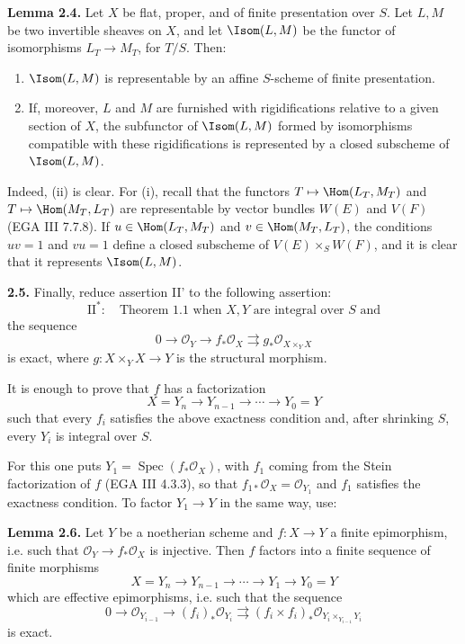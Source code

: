 \documentclass[11pt]{article}
\newcommand{\Spec}{\operatorname{Spec}}
\begin{document}
\textbf{Lemma 2.4.} Let \(X\) be flat, proper, and of finite presentation over \(S\). Let \(L,M\) be two invertible sheaves on \(X\), and let \(\Isom(L,M)\) be the functor of isomorphisms \(L_T\to M_T\), for \(T/S\). Then:
\begin{enumerate}[label=\roman*)]
\item \(\Isom(L,M)\) is representable by an affine \(S\)-scheme of finite presentation.
\item If, moreover, \(L\) and \(M\) are furnished with rigidifications relative to a given section of \(X\), the subfunctor of \(\Isom(L,M)\) formed by isomorphisms compatible with these rigidifications is represented by a closed subscheme of \(\Isom(L,M)\).
\end{enumerate}
Indeed, (ii) is clear. For (i), recall that the functors \(T\mapsto\Hom(L_T,M_T)\) and \(T\mapsto\Hom(M_T,L_T)\) are representable by vector bundles \(W(E)\) and \(V(F)\) (EGA III 7.7.8). If \(u\in\Hom(L_T,M_T)\) and \(v\in\Hom(M_T,L_T)\), the conditions \(uv=1\) and \(vu=1\) define a closed subscheme of \(V(E)\times_SW(F)\), and it is clear that it represents \(\Isom(L,M)\).

\textbf{2.5.} Finally, reduce assertion II' to the following assertion:
\[
  \text{II}^*:\quad
  \text{Theorem 1.1 when }X,Y\text{ are integral over }S\text{ and}
\]
the sequence
\[
  0\longrightarrow \mathcal O_Y
  \longrightarrow f_*\mathcal O_X
  \rightrightarrows g_*\mathcal O_{X\times_Y X}
\]
is exact, where \(g:X\times_YX\to Y\) is the structural morphism.

It is enough to prove that \(f\) has a factorization
\[
  X=Y_n\longrightarrow Y_{n-1}\longrightarrow\cdots\longrightarrow Y_0=Y
\]
such that every \(f_i\) satisfies the above exactness condition and, after shrinking \(S\), every \(Y_i\) is integral over \(S\).

For this one puts \(Y_1=\Spec(f_*\mathcal O_X)\), with \(f_1\) coming from the Stein factorization of \(f\) (EGA III 4.3.3), so that \(f_{1*}\mathcal O_X=\mathcal O_{Y_1}\) and \(f_1\) satisfies the exactness condition. To factor \(Y_1\to Y\) in the same way, use:

\textbf{Lemma 2.6.} Let \(Y\) be a noetherian scheme and \(f:X\to Y\) a finite epimorphism, i.e. such that \(\mathcal O_Y\to f_*\mathcal O_X\) is injective. Then \(f\) factors into a finite sequence of finite morphisms
\[
  X=Y_n\longrightarrow Y_{n-1}\longrightarrow\cdots\longrightarrow Y_1\longrightarrow Y_0=Y
\]
which are effective epimorphisms, i.e. such that the sequence
\[
  0\longrightarrow \mathcal O_{Y_{i-1}}
  \longrightarrow (f_i)_*\mathcal O_{Y_i}
  \rightrightarrows
  (f_i\times f_i)_*\mathcal O_{Y_i\times_{Y_{i-1}}Y_i}
\]
is exact.
\end{document}
